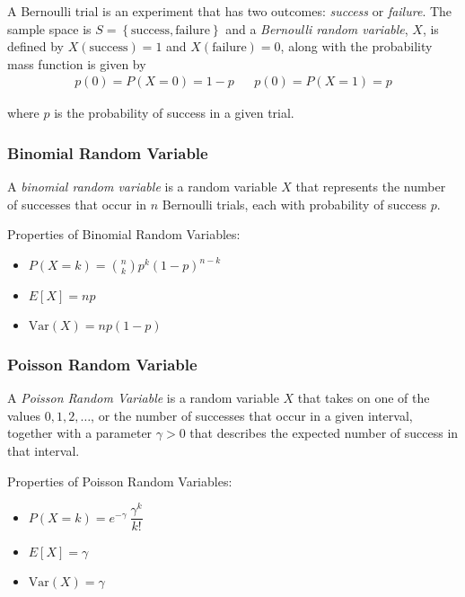 \documentclass[10pt]{article}
\begin{document}
		A Bernoulli trial is an experiment that has two outcomes: \emph{success} or \emph{failure}. The sample space is $S=\left\{ \text{success}, \text{failure}\right\}$ and a \emph{Bernoulli random variable}, $X$, is defined by $X(\text{success})=1$ and $X(\text{failure}) = 0$, along with the probability mass function is given by
		\begin{align*}
			p(0) = P(X=0) = 1 - p  && p(0) = P(X=1) = p
		\end{align*}
		
		\noindent where $p$ is the probability of success in a given trial.
		\subsubsection*{Binomial Random Variable}
		A \emph{binomial random variable} is a random variable $X$ that represents the number of successes that occur in $n$ Bernoulli trials, each with probability of success $p$.
		
		\noindent Properties of Binomial Random Variables:
		\begin{multicols}{3}
			\begin{itemize}
				\item $P(X=k) = {n \choose k} p^{k} (1-p)^{n-k}$
				\item $E[X] = np$
				\item $\text{Var}(X)= np(1-p) $
			\end{itemize}
		\end{multicols}
		
		
		\subsubsection*{Poisson Random Variable}
		
		A \emph{Poisson Random Variable} is a random variable $X$ that takes on one of the values $0, 1, 2, \ldots$, or the number of successes that occur in a given interval, together with a parameter $\gamma > 0$ that describes the expected number of success in that interval.
		
		\noindent Properties of Poisson Random Variables:
		
		\begin{multicols}{3}
			\begin{itemize}
				\item $P(X=k) = e^{-\gamma} \: \dfrac{\gamma^k}{k!}$
				\item $E[X] = \gamma$
				\item $\text{Var}(X) = \gamma$
			\end{itemize}
		\end{multicols}
	
\end{document}
